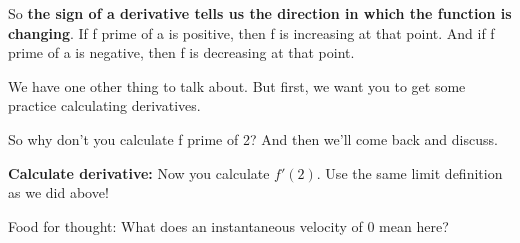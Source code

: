 \documentclass[pdftex, brazil, 12pt, twoside]{article}
\begin{document}
So \textbf{the sign of a derivative tells us
the direction in which the function is changing}.
If f prime of a is positive, then f
is increasing at that point.
And if f prime of a is negative, then f
is decreasing at that point.

\begin{figure}[H]
  \begin{center}
    \label{fig:derivative-at-point-4}
  \end{center}
\end{figure}

We have one other thing to talk about.
But first, we want you to get some practice calculating
derivatives.

So why don't you calculate f prime of 2?
And then we'll come back and discuss.

\begin{exercise}
  \textbf{Calculate derivative:} Now you calculate $f'(2)$.
  Use the same limit definition as we did above! 
\end{exercise}

Food for thought: What does an instantaneous velocity of 0 mean here?

\begin{figure}[H]
  \begin{center}
    \label{fig:derivative-at-point-5}
  \end{center}
\end{figure}
\end{document}
